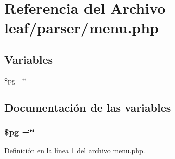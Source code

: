 \hypertarget{menu_8php}{\section{Referencia del Archivo leaf/parser/menu.php}
\label{menu_8php}
}
\subsection*{Variables}
\begin{DoxyCompactItemize}
\item 
\hyperlink{menu_8php_a46e68a28b1c1063670320ee4569d7ef2}{\$pg} =\char`\"{}\char`\"{}
\end{DoxyCompactItemize}


\subsection{Documentación de las variables}
\hypertarget{menu_8php_a46e68a28b1c1063670320ee4569d7ef2}{
\subsubsection[{\$pg}]{\setlength{\rightskip}{0pt plus 5cm}\$pg =\char`\"{}\char`\"{}}}\label{menu_8php_a46e68a28b1c1063670320ee4569d7ef2}


Definición en la línea 1 del archivo menu.\-php.

